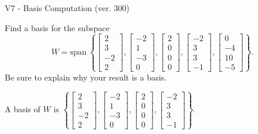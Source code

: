 \begin{exercise}
  \begin{exerciseTitle}V7 - Basis Computation (ver. 300)\end{exerciseTitle}
  \begin{exerciseStatement}
    Find a basis for the subspace 
\[W=\mathrm{span}\ \left\{\left[\begin{array}{r}
2 \\
3 \\
-2 \\
2
\end{array}\right] , \left[\begin{array}{r}
-2 \\
1 \\
-3 \\
0
\end{array}\right] , \left[\begin{array}{r}
2 \\
0 \\
0 \\
0
\end{array}\right] , \left[\begin{array}{r}
-2 \\
3 \\
3 \\
-1
\end{array}\right] , \left[\begin{array}{r}
0 \\
-4 \\
10 \\
-5
\end{array}\right]\right\}.\]
 Be sure to explain why your result is a basis.


  \end{exerciseStatement}
  \begin{exerciseAnswer}
   A basis of \(W\) is  \(\left\{\left[\begin{array}{r}
2 \\
3 \\
-2 \\
2
\end{array}\right] , \left[\begin{array}{r}
-2 \\
1 \\
-3 \\
0
\end{array}\right] , \left[\begin{array}{r}
2 \\
0 \\
0 \\
0
\end{array}\right] , \left[\begin{array}{r}
-2 \\
3 \\
3 \\
-1
\end{array}\right]\right\}\).
  


  \end{exerciseAnswer}
\end{exercise}
